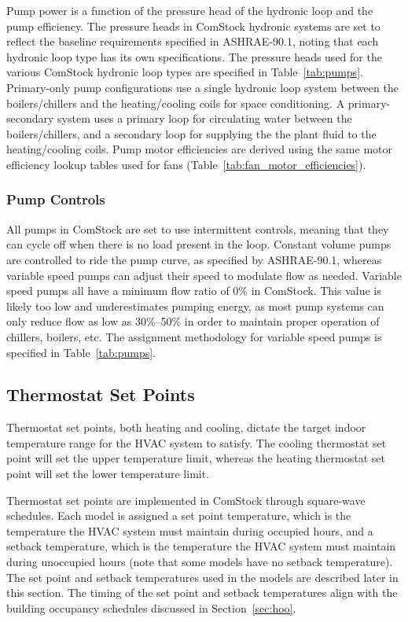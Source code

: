 Pump power is a function of the pressure head of the hydronic loop and the pump efficiency. The pressure heads in ComStock hydronic systems are set to reflect the baseline requirements specified in ASHRAE-90.1, noting that each hydronic loop type has its own specifications. The pressure heads used for the various ComStock hydronic loop types are specified in Table~\ref{tab:pumps}. Primary-only pump configurations use a single hydronic loop system between the boilers/chillers and the heating/cooling coils for space conditioning. A primary-secondary system uses a primary loop for circulating water between the boilers/chillers, and a secondary loop for supplying the the plant fluid to the heating/cooling coils. Pump motor efficiencies are derived using the same motor efficiency lookup tables used for fans (Table~\ref{tab:fan_motor_efficiencies}).

\subsubsection{Pump Controls}

All pumps in ComStock are set to use intermittent controls, meaning that they can cycle off when there is no load present in the loop. Constant volume pumps are controlled to ride the pump curve, as specified by ASHRAE-90.1, whereas variable speed pumps can adjust their speed to modulate flow as needed. Variable speed pumps all have a minimum flow ratio of 0\% in ComStock. This value is likely too low and underestimates pumping energy, as most pump systems can only reduce flow as low as 30\%--50\% in order to maintain proper operation of chillers, boilers, etc. The assignment methodology for variable speed pumps is specified in Table~\ref{tab:pumps}.




\subsection{Thermostat Set Points}
Thermostat set points, both heating and cooling, dictate the target indoor temperature range for the HVAC system to satisfy. The cooling thermostat set point will set the upper temperature limit, whereas the heating thermostat set point will set the lower temperature limit.

Thermostat set points are implemented in ComStock through square-wave schedules. Each model is assigned a set point temperature, which is the temperature the HVAC system must maintain during occupied hours, and a setback temperature, which is the temperature the HVAC system must maintain during unoccupied hours (note that some models have no setback temperature). The set point and setback temperatures used in the models are described later in this section. The timing of the set point and setback temperatures align with the building occupancy schedules discussed in Section~\ref{sec:hoo}.

